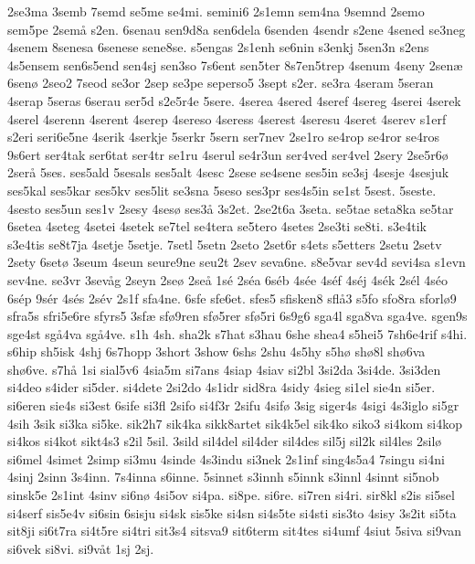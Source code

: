 2se3ma
3semb
7semd
se5me
se4mi.
semini6
2s1emn
sem4na
9semnd
2semo
sem5pe
2sem^^e5
s2en.
6senau
sen9d8a
sen6dela
6senden
4sendr
s2ene
4sened
se3neg
4senem
8senesa
6senese
sene8se.
s5engas
2s1enh
se6nin
s3enkj
5sen3n
s2ens
4s5ensem
sen6s5end
sen4sj
sen3so
7s6ent
sen5ter
8s7en5trep
4senum
4seny
2sen^^e6
6sen^^f8
2seo2
7seod
se3or
2sep
se3pe
seperso5
3sept
s2er.
se3ra
4seram
5seran
4serap
5seras
6serau
ser5d
s2e5r4e
5sere.
4serea
4sered
4seref
4sereg
4serei
4serek
4serel
4serenn
4serent
4serep
4sereso
4seress
4serest
4seresu
4seret
4serev
s1erf
s2eri
seri6e5ne
4serik
4serkje
5serkr
5sern
ser7nev
2se1ro
se4rop
se4ror
se4ros
9s6ert
ser4tak
ser6tat
ser4tr
se1ru
4serul
se4r3un
ser4ved
ser4vel
2sery
2se5r6^^f8
2ser^^e5
5ses.
ses5ald
5sesals
ses5alt
4sesc
2sese
se4sene
ses5in
se3sj
4sesje
4sesjuk
ses5kal
ses5kar
ses5kv
ses5lit
se3sna
5seso
ses3pr
ses4s5in
se1st
5sest.
5seste.
4sesto
ses5un
ses1v
2sesy
4ses^^f8
ses3^^e5
3s2et.
2se2t6a
3seta.
se5tae
seta8ka
se5tar
6setea
4seteg
4setei
4setek
se7tel
se4tera
se5tero
4setes
2se3ti
se8ti.
s3e4tik
s3e4tis
se8t7ja
4setje
5setje.
7setl
5setn
2seto
2set6r
s4ets
s5etters
2setu
2setv
2sety
6set^^f8
3seum
4seun
seure9ne
seu2t
2sev
seva6ne.
s8e5var
sev4d
sevi4sa
s1evn
sev4ne.
se3vr
3sev^^e5g
2seyn
2se^^f8
2se^^e5
1s^^e9
2s^^e9a
6s^^e9b
4s^^e9e
4s^^e9f
4s^^e9j
4s^^e9k
2s^^e9l
4s^^e9o
6s^^e9p
9s^^e9r
4s^^e9s
2s^^e9v
2s1f
sfa4ne.
6sfe
sfe6et.
sfes5
sfisken8
sfl^^e53
s5fo
sfo8ra
sforl^^f89
sfra5s
sfri5e6re
sfyrs5
3sf^^e6
sf^^f89ren
sf^^f85rer
sf^^f85ri
6s9g6
sga4l
sga8va
sga4ve.
sgen9s
sge4st
sg^^e54va
sg^^e54ve.
s1h
4sh.
sha2k
s7hat
s3hau
6she
shea4
s5hei5
7sh6e4rif
s4hi.
s6hip
sh5isk
4shj
6s7hopp
3short
3show
6shs
2shu
4s5hy
s5h^^f8
sh^^f88l
sh^^f86va
sh^^f86ve.
s7h^^e5
1si
sial5v6
4sia5m
si7ans
4siap
4siav
si2bl
3si2da
3si4de.
3si3den
si4deo
s4ider
si5der.
si4dete
2si2do
4s1idr
sid8ra
4sidy
4sieg
si1el
sie4n
si5er.
si6eren
sie4s
si3est
6sife
si3fl
2sifo
si4f3r
2sifu
4sif^^f8
3sig
siger4s
4sigi
4s3iglo
si5gr
4sih
3sik
si3ka
si5ke.
sik2h7
sik4ka
sikk8artet
sik4k5el
sik4ko
siko3
si4kom
si4kop
si4kos
si4kot
sikt4s3
s2il
5sil.
3sild
sil4del
sil4der
sil4des
sil5j
sil2k
sil4les
2sil^^f8
si6mel
4simet
2simp
si3mu
4sinde
4s3indu
si3nek
2s1inf
sing4s5a4
7singu
si4ni
4sinj
2sinn
3s4inn.
7s4inna
s6inne.
5sinnet
s3innh
s5innk
s3innl
4sinnt
si5nob
sinsk5e
2s1int
4sinv
si6n^^f8
4si5ov
si4pa.
si8pe.
si6re.
si7ren
si4ri.
sir8kl
s2is
si5sel
si4serf
sis5e4v
si6sin
6sisju
si4sk
sis5ke
si4sn
si4s5te
si4sti
sis3to
4sisy
3s2it
si5ta
sit8ji
si6t7ra
si4t5re
si4tri
sit3s4
sitsva9
sit6term
sit4tes
si4umf
4siut
5siva
si9van
si6vek
si8vi.
si9v^^e5t
1sj
2sj.
